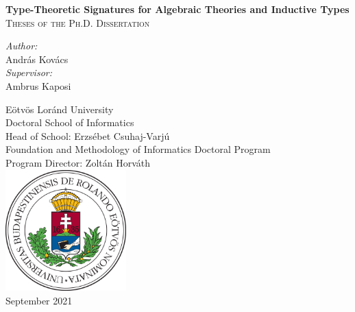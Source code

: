 \documentclass[12pt]{article}
\begin{document}
\clearpage

\begin{titlepage}
    \begin{center}
        \vspace*{1cm}

        {\LARGE \textbf{Type-Theoretic Signatures for Algebraic Theories and Inductive Types}}\\
        \vspace{1em}
        {\large \textsc{Theses of the Ph.D. Dissertation}}

        \vspace{2em}

        \textit{Author:}\\
        {\large András Kovács}\\
        \vspace{1em}
        \textit{Supervisor:}\\
        {\large Ambrus Kaposi}

        \vfill
        \vspace{4em}

        {\normalsize
        Eötvös Loránd University\\
        Doctoral School of Informatics\\
        Head of School: Erzsébet Csuhaj-Varjú\\
        Foundation and Methodology of Informatics Doctoral Program\\
        Program Director: Zoltán Horváth\\}
        \vspace{1em}
        \includegraphics[width=0.35\textwidth]{elte_cimer_szines}\\
        \vspace{1em}
        {\large September 2021}

    \end{center}
\end{titlepage}
\thispagestyle{empty}
\end{document}

